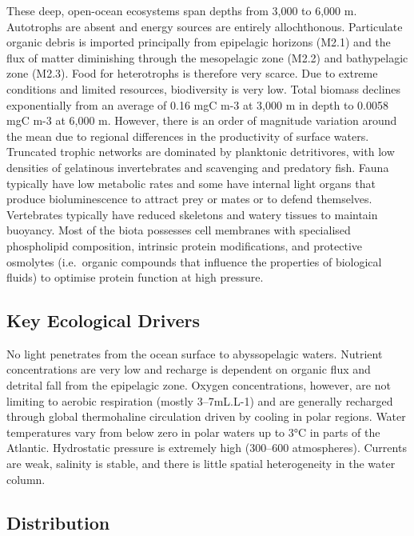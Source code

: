 \documentclass[
  letterpaper,
  DIV=11,
  numbers=noendperiod]{scrartcl}
\begin{document}
These deep, open-ocean ecosystems span depths from 3,000 to 6,000 m.
Autotrophs are absent and energy sources are entirely allochthonous.
Particulate organic debris is imported principally from epipelagic
horizons (M2.1) and the flux of matter diminishing through the
mesopelagic zone (M2.2) and bathypelagic zone (M2.3). Food for
heterotrophs is therefore very scarce. Due to extreme conditions and
limited resources, biodiversity is very low. Total biomass declines
exponentially from an average of 0.16 mgC m-3 at 3,000 m in depth to
0.0058 mgC m-3 at 6,000 m. However, there is an order of magnitude
variation around the mean due to regional differences in the
productivity of surface waters. Truncated trophic networks are dominated
by planktonic detritivores, with low densities of gelatinous
invertebrates and scavenging and predatory fish. Fauna typically have
low metabolic rates and some have internal light organs that produce
bioluminescence to attract prey or mates or to defend themselves.
Vertebrates typically have reduced skeletons and watery tissues to
maintain buoyancy. Most of the biota possesses cell membranes with
specialised phospholipid composition, intrinsic protein modifications,
and protective osmolytes (i.e.~organic compounds that influence the
properties of biological fluids) to optimise protein function at high
pressure.

\subsection{Key Ecological Drivers}\label{key-ecological-drivers-38}

No light penetrates from the ocean surface to abyssopelagic waters.
Nutrient concentrations are very low and recharge is dependent on
organic flux and detrital fall from the epipelagic zone. Oxygen
concentrations, however, are not limiting to aerobic respiration (mostly
3--7mL.L-1) and are generally recharged through global thermohaline
circulation driven by cooling in polar regions. Water temperatures vary
from below zero in polar waters up to 3°C in parts of the Atlantic.
Hydrostatic pressure is extremely high (300--600 atmospheres). Currents
are weak, salinity is stable, and there is little spatial heterogeneity
in the water column.

\subsection{Distribution}\label{distribution-38}
\end{document}
